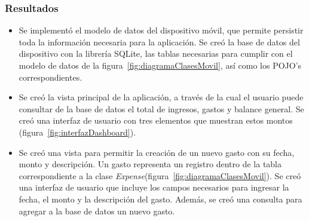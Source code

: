 \subsubsection{Resultados}
\begin{itemize}
\item Se implementó el modelo de datos del dispositivo móvil, que permite persistir toda la información necesaria para la aplicación. Se creó la base de datos del dispositivo con la librería SQLite, las tablas necesarias para cumplir con el modelo de datos de la figura~\ref{fig:diagramaClasesMovil}, así como los POJO's correspondientes.
\item Se creó la vista principal de la aplicación, a través de la cual el usuario puede consultar de la base de datos el total de ingresos, gastos y balance general. Se creó una interfaz de usuario con tres elementos que muestran estos montos (figura~\ref{fig:interfazDashboard}).
\item Se creó una vista para permitir la creación de un nuevo gasto con su fecha, monto y descripción. Un gasto representa un registro dentro de la tabla correspondiente a la clase \textit{Expense}(figura~\ref{fig:diagramaClasesMovil}). Se creó una interfaz de usuario que incluye los campos necesarios para ingresar la fecha, el monto y la descripción del gasto. Además, se creó una consulta para agregar a la base de datos un nuevo gasto.
\end{itemize}

%
%

